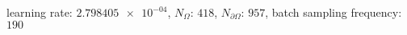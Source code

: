 learning rate: $\num[scientific-notation=true]{2.798405e-04}$, $N_{\Omega}$: $\num[scientific-notation=false]{418}$, $N_{\partial\Omega}$: $\num[scientific-notation=false]{957}$, batch sampling frequency: $\num[scientific-notation=false]{190}$